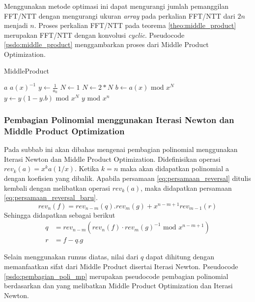 Menggunakan metode optimasi ini dapat mengurangi jumlah pemanggilan FFT/NTT dengan mengurangi ukuran \textit{array} pada perkalian FFT/NTT dari $ 2n $ menjadi $ n $. Proses perkalian FFT/NTT pada teorema \ref{theo:middle_product} merupakan FFT/NTT dengan konvolusi \textit{cyclic}. Pseudocode \ref{psdo:middle_product} menggambarkan proses dari Middle Product Optimization.

\begin{algorithm}
	\caption{MiddleProduct}
	\label{psdo:middle_product}
	\begin{algorithmic}[1]
		\Require $ a $
		\Ensure $ a(x)^{-1} $
		\State $ y \leftarrow \frac{1}{a_0} $
		\State $ N \leftarrow 1 $
			\State $ N \leftarrow 2 * N $
			\State $ b \leftarrow a(x) \text{ mod } x^N $
			\State $ y \leftarrow y(1- y.b) \text{ mod } x^N $
		\EndWhile
		\State \Return $ y \text{ mod } x^n $
	\end{algorithmic}
\end{algorithm}


\subsubsection{Pembagian Polinomial menggunakan Iterasi Newton dan Middle Product Optimization}
Pada subbab ini akan dibahas mengenai pembagian polinomial menggunakan Iterasi Newton dan Middle Product Optimization. Didefinisikan operasi $ rev_k(a) = x^ka(1/x) $. Ketika $ k = n $ maka akan didapatkan polinomial a dengan koefisien yang dibalik. Apabila persamaan \eqref{eq:persamaan_reversal} ditulis kembali dengan melibatkan operasi $ rev_k(a) $, maka didapatkan persamaan \eqref{eq:persamaan_reversal_baru}.
\begin{equation}
	rev_n(f) = rev_{n-m}(q).rev_m(g)+x^{n-m+1}rev_{m-1}(r)
	\label{eq:persamaan_reversal_baru}
\end{equation}
Sehingga didapatkan sebagai berikut
\begin{equation}
	\begin{aligned}
		q &= rev_{n-m}(rev_{n}(f) \cdot rev_{m}(g)^{-1} \text{ mod } x^{n - m + 1}) \\
		r &= f - q.g
	\end{aligned}
\end{equation}

Selain menggunakan rumus diatas, nilai dari $ q $ dapat dihitung dengan memanfaatkan sifat dari Middle Product disertai Iterasi Newton. Pseudocode \ref{psdo:pembagian_poli_mp} merupakan pseudocode pembagian polinomial berdasarkan \cite{middle_product_hal} dan \cite{middle_product_op} yang melibatkan Middle Product Optimization dan Iterasi Newton. 

